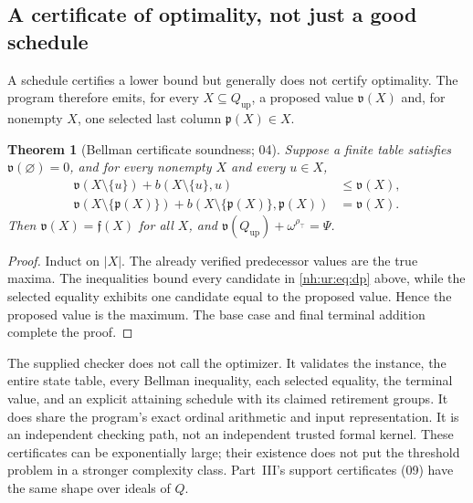 \documentclass[11pt,a4paper]{article}
\newtheorem{theorem}{Theorem}[section]
\theoremstyle{definition}
\theoremstyle{remark}
\newcommand{\Qup}{Q_{\mathrm{up}}}
\newcommand{\rtop}{\rho_{\top}}
\begin{document}
\subsection{A certificate of optimality, not just a good schedule}
A schedule certifies a lower bound but generally does not certify optimality.
The program therefore emits, for every $X\subseteq\Qup$, a proposed value
$\mathfrak v(X)$ and, for nonempty $X$, one selected last column
$\mathfrak p(X)\in X$.

\begin{theorem}[Bellman certificate soundness; 04]\label{nh:ur:thm:certificate}
Suppose a finite table satisfies $\mathfrak v(\varnothing)=0$, and for every
nonempty $X$ and every $u\in X$,
\begin{align}
 \mathfrak v(X\setminus\{u\})+b(X\setminus\{u\},u)&\le\mathfrak v(X),\label{nh:ur:eq:certbound}\\
 \mathfrak v(X\setminus\{\mathfrak p(X)\})+b(X\setminus\{\mathfrak p(X)\},\mathfrak p(X))&=\mathfrak v(X).
 \label{nh:ur:eq:certattain}
\end{align}
Then $\mathfrak v(X)=\mathfrak f(X)$ for all $X$, and
$\mathfrak v(\Qup)+\omega^{\rtop}=\Psi$.
\end{theorem}
\begin{proof}
Induct on $|X|$. The already verified predecessor values are the true maxima.
The inequalities bound every candidate in \eqref{nh:ur:eq:dp} above, while
the selected equality exhibits one candidate equal to the proposed value.
Hence the proposed value is the maximum. The base case and final terminal
addition complete the proof.
\end{proof}

The supplied checker does not call the optimizer. It validates the instance,
the entire state table, every Bellman inequality, each selected equality, the
terminal value, and an explicit attaining schedule with its claimed
retirement groups. It does share the program's exact ordinal arithmetic and
input representation. It is an independent checking path, not an independent
trusted formal kernel. These certificates can be exponentially large; their
existence does not put the threshold problem in a stronger complexity class.
Part~III's support certificates (09) have the same shape over ideals of $Q$.
\end{document}
